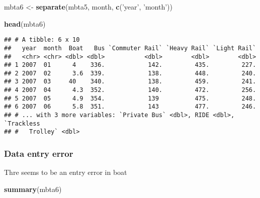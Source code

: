 \documentclass[]{article}
\newenvironment{Shaded}{\begin{snugshade}}{\end{snugshade}}
\newcommand{\KeywordTok}[1]{\textcolor[rgb]{0.13,0.29,0.53}{\textbf{#1}}}
\newcommand{\NormalTok}[1]{#1}
\newcommand{\StringTok}[1]{\textcolor[rgb]{0.31,0.60,0.02}{#1}}
\begin{document}
\begin{Shaded}
\begin{Highlighting}[]
\NormalTok{mbta6 <-}\StringTok{ }\KeywordTok{separate}\NormalTok{(mbta5, month, }\KeywordTok{c}\NormalTok{(}\StringTok{'year'}\NormalTok{, }\StringTok{'month'}\NormalTok{))}

\KeywordTok{head}\NormalTok{(mbta6)}
\end{Highlighting}
\end{Shaded}

\begin{verbatim}
## # A tibble: 6 x 10
##   year  month  Boat   Bus `Commuter Rail` `Heavy Rail` `Light Rail`
##   <chr> <chr> <dbl> <dbl>           <dbl>        <dbl>        <dbl>
## 1 2007  01      4    336.            142.         435.         227.
## 2 2007  02      3.6  339.            138.         448.         240.
## 3 2007  03     40    340.            138.         459.         241.
## 4 2007  04      4.3  352.            140.         472.         256.
## 5 2007  05      4.9  354.            139          475.         248.
## 6 2007  06      5.8  351.            143          477.         246.
## # ... with 3 more variables: `Private Bus` <dbl>, RIDE <dbl>, `Trackless
## #   Trolley` <dbl>
\end{verbatim}

\hypertarget{data-entry-error}{%
\subsubsection{Data entry error}\label{data-entry-error}}

Thre seems to be an entry error in boat

\begin{Shaded}
\begin{Highlighting}[]
\KeywordTok{summary}\NormalTok{(mbta6)}
\end{Highlighting}
\end{Shaded}
\end{document}
